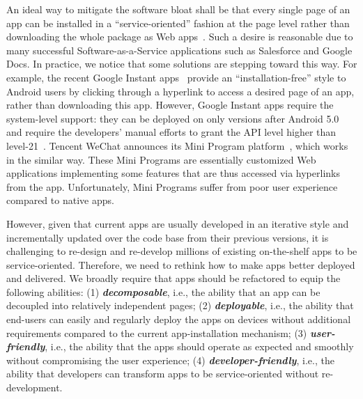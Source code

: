 An ideal way to mitigate the software bloat shall be that every single page of an app can be installed in a ``service-oriented'' fashion at the page level rather than downloading the whole package as Web apps~\cite{ICWS15Liu}. Such a desire is reasonable due to many successful Software-as-a-Service applications such as Salesforce and Google Docs. In practice, we notice that some solutions are stepping toward this way. For example, the recent Google Instant apps~\cite{instantapp} provide an ``installation-free'' style to Android users by clicking through a hyperlink to access a desired page of an app, rather than downloading this app. However, Google Instant apps require the system-level support: they can be deployed on only versions after Android 5.0 and require the developers' manual efforts to grant the API level higher than level-21~\cite{instantapp}. Tencent WeChat announces its Mini Program platform~\cite{miniprogram}, which works in the similar way. These Mini Programs are essentially customized Web applications implementing some features that are thus accessed via hyperlinks from the app. Unfortunately, Mini Programs suffer from poor user experience compared to native apps.

However, given that current apps are usually developed in an iterative style and incrementally updated over the code base from their previous versions, it is challenging  to re-design and re-develop millions of existing on-the-shelf apps to be service-oriented. Therefore, we need to rethink how to make apps better deployed and delivered.  We broadly require that apps should be refactored to equip the following abilities: (1) \textit{\textbf{decomposable}}, i.e., the ability that an app can be decoupled into relatively independent pages; (2) \textit{\textbf{deployable}}, i.e., the ability that end-users can easily and regularly deploy the apps on devices without additional requirements compared to the current app-installation mechanism; (3) \textit{\textbf{user-friendly}}, i.e., the ability that the apps should operate as expected and smoothly without compromising the user experience; (4) \textit{\textbf{developer-friendly}}, i.e., the ability that developers can transform apps to be service-oriented without re-development.


